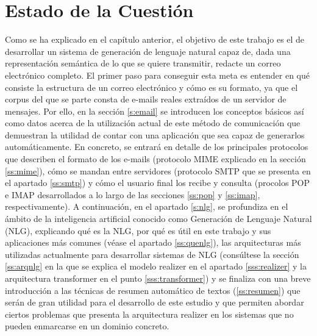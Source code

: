 \chapter{Estado de la Cuestión}
\label{cap:estadoDeLaCuestion}


Como se ha explicado en el capítulo anterior, el objetivo de este trabajo es el de desarrollar un sistema de generación de lenguaje natural capaz de, dada una representación semántica de lo que se quiere transmitir, redacte un correo electrónico completo. El primer paso para conseguir esta meta es entender en qué consiste la estructura de un correo electrónico y cómo es su formato, ya que el corpus del que se parte consta de e-mails reales extraídos de un servidor de mensajes. Por ello, en la sección \ref{s:email} se introducen los conceptos básicos así como datos acerca de la utilización actual de este método de comunicación que demuestran la utilidad de contar con una aplicación que sea capaz de generarlos automáticamente. En concreto, se entrará en detalle de los principales protocolos que describen el formato de los e-mails (protocolo MIME explicado en la sección \ref{ss:mime}), cómo se mandan entre servidores (protocolo SMTP que se presenta en el apartado \ref{ss:smtp}) y cómo el usuario final los recibe y consulta (procolos POP e IMAP desarrollados a lo largo de las secciones \ref{ss:pop} y \ref{ss:imap}, respectivamente). A continuación, en el apartado \ref{s:nlg}, se profundiza en el ámbito de la inteligencia artificial conocido como Generación de Lenguaje Natural (NLG), explicando qué es la NLG, por qué es útil en este trabajo y sus aplicaciones más comunes (véase el apartado \ref{ss:quenlg}), las arquitecturas más utilizadas actualmente para desarrollar sistemas de NLG (consúltese la sección \ref{ss:arqnlg} en la que se explica el modelo realizer en el apartado \ref{sss:realizer} y la arquitectura transformer en el punto \ref{sss:transformer}) y se finaliza con una breve introducción a las técnicas de resumen automático de textos (\ref{ss:resumen}) que serán de gran utilidad para el desarrollo de este estudio y que permiten abordar ciertos problemas que presenta la arquitectura realizer en los sistemas que no pueden enmarcarse en un dominio concreto.





